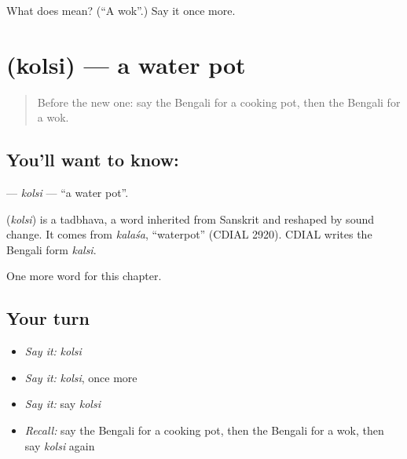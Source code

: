 \begin{tcolorbox}[breakable,colback=teal!4,colframe=teal!35!black,title={Before you move on}]
What does  mean? (\textquotedblleft{}A wok\textquotedblright{}.) Say it once more.
\end{tcolorbox}
\section[\texorpdfstring{\bn{কলসি} (kolsi)}{কলসি (kolsi)}]{ (kolsi) — a water pot}

\label{lesson:BN-C107-kolsi}



\begin{quote}
Before the new one: say the Bengali for a cooking pot, then the Bengali for a wok.
\end{quote}

\subsection*{You'll want to know: }
\textbf{} — \emph{kolsi} — \textquotedblleft{}a water pot\textquotedblright{}.

\begin{cousinweb}
\textbf{} (\emph{kolsi}) is a tadbhava, a word inherited from Sanskrit and reshaped by sound change. It comes from \emph{kalaśa}, \textquotedblleft{}waterpot\textquotedblright{} (CDIAL 2920). CDIAL writes the Bengali form \emph{kalsi}.
\end{cousinweb}

\begin{grammarlens}[title={What you've built}]
One more word for this chapter.
\end{grammarlens}

\subsection*{Your turn}
\begin{itemize}
\raggedright
  \item \emph{Say it:} \emph{kolsi}
  \item \emph{Say it:} \emph{kolsi}, once more
  \item \emph{Say it:} say \emph{kolsi}
  \item \emph{Recall:} say the Bengali for a cooking pot, then the Bengali for a wok, then say \emph{kolsi} again
\end{itemize}

